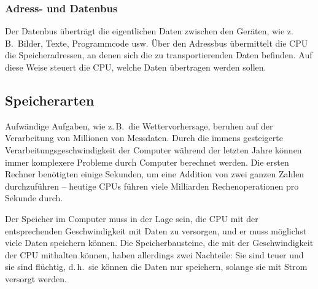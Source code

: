 \subsubsection{Adress- und Datenbus}

Der Datenbus überträgt die eigentlichen Daten zwischen den Geräten, wie z.\,B.\
Bilder, Texte, Programmcode usw. Über den Adressbus übermittelt die CPU die
Speicheradressen, an denen sich die zu transportierenden Daten befinden. Auf
diese Weise steuert die CPU, welche Daten übertragen werden sollen.

\subsection{Speicherarten}

Aufwändige Aufgaben, wie z.\,B.\ die Wettervorhersage, beruhen auf der
Verarbeitung von Millionen von Messdaten. Durch die immens gesteigerte
Verarbeitungsgeschwindigkeit der Computer während der letzten Jahre können
immer komplexere Probleme durch Computer berechnet werden. Die ersten Rechner
benötigten einige Sekunden, um eine Addition von zwei ganzen Zahlen
durchzuführen -- heutige CPUs führen viele Milliarden Rechenoperationen
pro Sekunde durch.

Der Speicher im Computer muss in der Lage sein, die CPU mit der entsprechenden
Geschwindigkeit mit Daten zu versorgen, und er muss möglichst viele Daten
speichern können. Die Speicherbausteine, die mit der Geschwindigkeit der CPU
mithalten können, haben allerdings zwei Nachteile: Sie sind teuer und sie sind
flüchtig, d.\,h.\ sie können die Daten nur speichern, solange sie mit Strom
versorgt werden.

